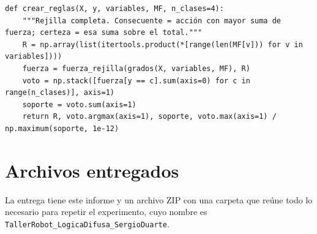\documentclass[11pt,letterpaper]{article}
\begin{document}
\begin{lstlisting}[caption={Rejilla completa con consecuentes aprendidos}]
def crear_reglas(X, y, variables, MF, n_clases=4):
    """Rejilla completa. Consecuente = acción con mayor suma de fuerza; certeza = esa suma sobre el total."""
    R = np.array(list(itertools.product(*[range(len(MF[v])) for v in variables])))
    fuerza = fuerza_rejilla(grados(X, variables, MF), R)
    voto = np.stack([fuerza[y == c].sum(axis=0) for c in range(n_clases)], axis=1)
    soporte = voto.sum(axis=1)
    return R, voto.argmax(axis=1), soporte, voto.max(axis=1) / np.maximum(soporte, 1e-12)
\end{lstlisting}

\section{Archivos entregados}
\label{anexo:archivos}

La entrega tiene este informe y un archivo ZIP con una carpeta que reúne todo lo necesario para repetir el experimento, cuyo nombre es \texttt{TallerRobot\_LogicaDifusa\_SergioDuarte}.
\end{document}
